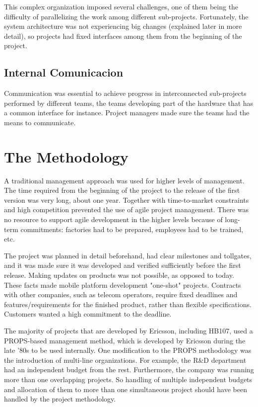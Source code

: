 \documentclass[journal]{IEEEtran}
\begin{document}
This complex organization imposed several challenges, one of them being the difficulty of parallelizing the work among different sub-projects. Fortunately, the system architecture was not experiencing big changes (explained later in more detail), so projects had fixed interfaces among them from the beginning of the project.

\subsection{Internal Comunicacion}
Communication was essential to achieve progress in interconnected sub-projects performed by different teams, the teams developing part of the hardware that has a common interface for instance. Project managers made sure the teams had the means to communicate.  


\section{The Methodology}
A traditional management approach was used for higher levels of management. The time required from the beginning of the project to the release of the first version was very long, about one year. Together with time-to-market constraints and high competition prevented the use of agile project management. There was no resource to support agile development in the higher levels because of long-term commitments: factories had to be prepared, employees had to be trained, etc. 

The project was planned in detail beforehand, had clear milestones and tollgates, and it was made sure it was developed and verified sufficiently before the first release. Making updates on products was not possible, as opposed to today. These facts made mobile platform development "one-shot" projects. Contracts with other companies, such as telecom operators, require fixed deadlines and features/requirements for the finished product, rather than flexible specifications. Customers wanted a high commitment to the deadline.

The majority of projects that are developed by Ericsson, including HB107, used a PROPS-based management method, which is developed by Ericsson during the late '80s to be used internally. One modification to the PROPS methodology was the introduction of multi-line organizations. For example, the R\&D department had an independent budget from the rest. Furthermore, the company was running more than one overlapping projects. So handling of multiple independent budgets and allocation of them to more than one simultaneous project should have been handled by the project methodology. 
\end{document}
